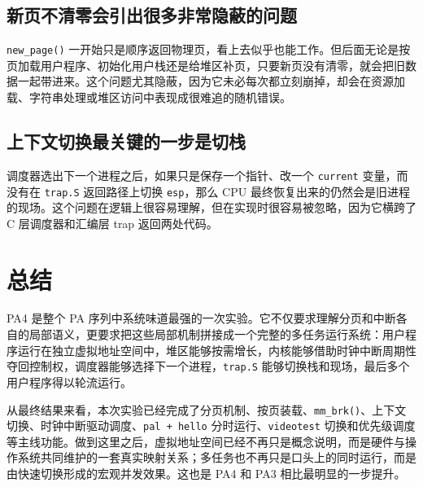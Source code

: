 \documentclass[a4paper]{article}
\begin{document}
\subsection{新页不清零会引出很多非常隐蔽的问题}
\texttt{new\_page()} 一开始只是顺序返回物理页，看上去似乎也能工作。但后面无论是按页加载用户程序、初始化用户栈还是给堆区补页，只要新页没有清零，就会把旧数据一起带进来。这个问题尤其隐蔽，因为它未必每次都立刻崩掉，却会在资源加载、字符串处理或堆区访问中表现成很难追的随机错误。

\subsection{上下文切换最关键的一步是切栈}
调度器选出下一个进程之后，如果只是保存一个指针、改一个 \texttt{current} 变量，而没有在 \texttt{trap.S} 返回路径上切换 \texttt{esp}，那么 CPU 最终恢复出来的仍然会是旧进程的现场。这个问题在逻辑上很容易理解，但在实现时很容易被忽略，因为它横跨了 C 层调度器和汇编层 trap 返回两处代码。

\section{总结}
PA4 是整个 PA 序列中系统味道最强的一次实验。它不仅要求理解分页和中断各自的局部语义，更要求把这些局部机制拼接成一个完整的多任务运行系统：用户程序运行在独立虚拟地址空间中，堆区能够按需增长，内核能够借助时钟中断周期性夺回控制权，调度器能够选择下一个进程，\texttt{trap.S} 能够切换栈和现场，最后多个用户程序得以轮流运行。

从最终结果来看，本次实验已经完成了分页机制、按页装载、\texttt{mm\_brk()}、上下文切换、时钟中断驱动调度、\texttt{pal + hello} 分时运行、\texttt{videotest} 切换和优先级调度等主线功能。做到这里之后，虚拟地址空间已经不再只是概念说明，而是硬件与操作系统共同维护的一套真实映射关系；多任务也不再只是口头上的同时运行，而是由快速切换形成的宏观并发效果。这也是 PA4 和 PA3 相比最明显的一步提升。
\end{document}

